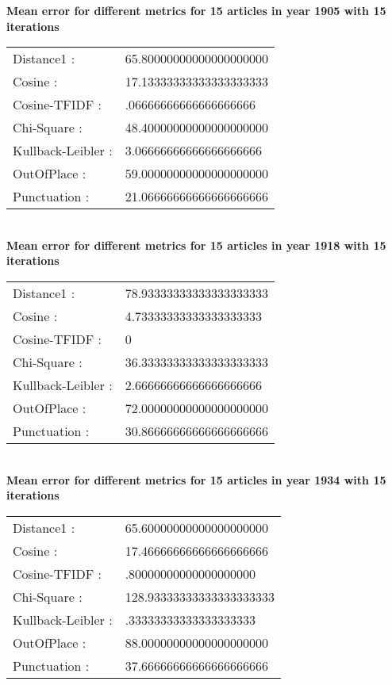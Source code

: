 \textbf{Mean error for different metrics for 15 articles in year 1905 with 15 iterations}\\
\begin{tabular}{p{3cm} p{5cm}}
    Distance1 :& 65.80000000000000000000\\
    Cosine :& 17.13333333333333333333\\
    Cosine-TFIDF :& .06666666666666666666\\
    Chi-Square :& 48.40000000000000000000\\
    Kullback-Leibler :& 3.06666666666666666666\\
    OutOfPlace :& 59.00000000000000000000\\
    Punctuation :& 21.06666666666666666666\\
\end{tabular}\\
 
\textbf{Mean error for different metrics for 15 articles in year 1918 with 15 iterations}\\
\begin{tabular}{p{3cm} p{5cm}}
    Distance1 :& 78.93333333333333333333\\
    Cosine :& 4.73333333333333333333\\
    Cosine-TFIDF :& 0\\
    Chi-Square :& 36.33333333333333333333\\
    Kullback-Leibler :& 2.66666666666666666666\\
    OutOfPlace :& 72.00000000000000000000\\
    Punctuation :& 30.86666666666666666666\\
\end{tabular}\\
 
\textbf{Mean error for different metrics for 15 articles in year 1934 with 15 iterations}\\
\begin{tabular}{p{3cm} p{5cm}}
    Distance1 :& 65.60000000000000000000\\
    Cosine :& 17.46666666666666666666\\
    Cosine-TFIDF :& .80000000000000000000\\
    Chi-Square :& 128.93333333333333333333\\
    Kullback-Leibler :& .33333333333333333333\\
    OutOfPlace :& 88.00000000000000000000\\
    Punctuation :& 37.66666666666666666666\\
\end{tabular}\\
 
